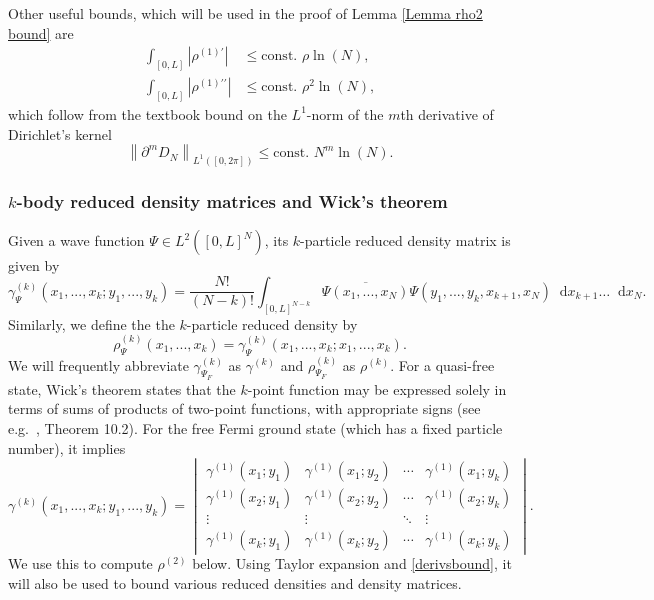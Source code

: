 \documentclass[a4paper,11pt]{article}
\newcommand{\norm}[1]{\left\lVert #1 \right\rVert}
\newcommand{\abs}[1]{\left\lvert #1 \right\rvert}
\newcommand*\diff{\mathop{}\!\mathrm{d}}
\numberwithin{equation}{section}
\begin{document}
	Other useful bounds, which will be used in the proof of Lemma \ref{Lemma rho2 bound} are
	\begin{equation}\label{EqDirichletKernelDerivativeBound}
		\begin{aligned}
			\int_{[0,L]}\abs{\rho^{(1)\prime}}&\leq \text{const. }\rho\ln(N),\\
			\int_{[0,L]}\abs{\rho^{(1)\prime\prime}}&\leq \text{const. }\rho^2\ln(N),
		\end{aligned}
	\end{equation}
	which follow from the textbook bound on the $L^1$-norm of the $m$th derivative of Dirichlet's kernel $$ \norm{\partial^mD_N}_{L^1([0,2\pi])}\leq \text{const. }N^{m}\ln(N). $$
	
	\subsubsection{$k$-body reduced density matrices and Wick's theorem}
	Given a wave function $\Psi\in L^2([0,L]^N)$, its $k$-particle reduced density matrix is given by\begin{equation}
		\gamma_{\Psi}^{(k)}(x_1,...,x_k;y_1,...,y_k)=\frac{N!}{(N-k)!}\int_{[0,L]^{N-k}}\overline{\Psi(x_1,...,x_N)}\Psi(y_1,...,y_k,x_{k+1},x_N)\diff x_{k+1}\ldots\diff x_N.
	\end{equation}
	Similarly, we define the the $k$-particle reduced density by\begin{equation}
		\rho_{\Psi}^{(k)}(x_1,...,x_k)=\gamma_{\Psi}^{(k)}(x_1,...,x_k;x_1,...,x_k).
	\end{equation}
	We will frequently abbreviate $\gamma_{\Psi_F}^{(k)}$ as $\gamma^{(k)}$ and $\rho_{\Psi_F}^{(k)}$ as $\rho^{(k)}$.
	For a quasi-free state, Wick's theorem states that the $k$-point function may be expressed solely in terms of sums of products of two-point functions, with appropriate signs (see e.g.\ \cite{solovej2007many}, Theorem 10.2). For the free Fermi ground state (which has a fixed particle number), it implies
	\begin{equation}
		\label{Wickexpression}
		\gamma^{(k)}(x_1,...,x_k;y_1,...,y_k) =\begin{vmatrix}
			\gamma^{(1)}(x_1;y_1)&\gamma^{(1)}(x_1;y_2)&\cdots&\gamma^{(1)}(x_1;y_k)\\
			\gamma^{(1)}(x_2;y_1)&\gamma^{(1)}(x_2;y_2)&\cdots&\gamma^{(1)}(x_2;y_k)\\
			\vdots&\vdots &\ddots&\vdots\\
			\gamma^{(1)}(x_k;y_1)&\gamma^{(1)}(x_k;y_2)&\cdots&\gamma^{(1)}(x_k;y_k)
		\end{vmatrix}.
	\end{equation}
	We use this to compute $\rho^{(2)}$ below. Using Taylor expansion and \eqref{derivsbound}, it will also be used to bound various reduced densities and density matrices.
	
\end{document}
